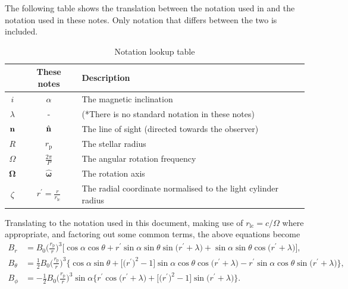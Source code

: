 \documentclass{book}
\newcommand{\rL}{r_\text{lc}} %
\newcommand{\rp}{r_\text{p}} %
\begin{document}
The following table shows the translation between the notation used in \citet{Barnard1986} and the notation used in these notes.
Only notation that differs between the two is included.
\begin{table}[!h]
    \centering
    \caption{Notation lookup table}
    \label{tbl:barnard_notation}
    \begin{tabular}{ccl}
        \citet{Barnard1986} & These notes & Description \\
        \hline
        $i$ & $\alpha$ & The magnetic inclination \\
        $\lambda$ & - & (*There is no standard notation in these notes) \\
        ${\bf n}$ & $\hat{\bf n}$ & The line of sight (directed towards the observer) \\
        $R$ & $\rp$ & The stellar radius \\
        $\Omega$ & $\frac{2\pi}{P}$ & The angular rotation frequency \\
        ${\pmb \Omega}$ & $\hat{\pmb \omega}$ & The rotation axis \\
        $\zeta$ & $r^\prime = \frac{r}{\rL}$ & The radial coordinate normalised to the light cylinder radius \\
        \hline
    \end{tabular}
\end{table}

Translating to the notation used in this document, making use of $\rL = c/\Omega$ where appropriate, and factoring out some common terms, the above equations become
\begin{equation}
    \begin{aligned}
        B_r &= B_0\bigg(\frac{\rp}{r}\bigg)^3 \bigg[ \cos \alpha \cos \theta +
               r^\prime \sin \alpha \sin \theta \sin\big(r^\prime + \lambda\big) +
               \sin \alpha \sin \theta \cos\big(r^\prime + \lambda\big)\bigg], \\
        B_\theta &= \frac{1}{2}B_0 \bigg(\frac{\rp}{r}\bigg)^3 \bigg\{\cos \alpha \sin \theta +
                    \Big[\big(r^\prime\big)^2 - 1\Big] \sin \alpha \cos \theta \cos\big(r^\prime + \lambda\big) -
                    r^\prime \sin \alpha \cos \theta \sin\big(r^\prime + \lambda\big)\bigg\}, \\
        B_\phi &= -\frac{1}{2} B_0 \bigg(\frac{\rp}{r}\bigg)^3 \sin \alpha \bigg\{r^\prime \cos\big(r^\prime + \lambda\big) +
                  \Big[\big(r^\prime\big)^2 - 1\Big] \sin\big(r^\prime + \lambda\big)\bigg\}.
    \end{aligned}
\end{equation}
\end{document}
